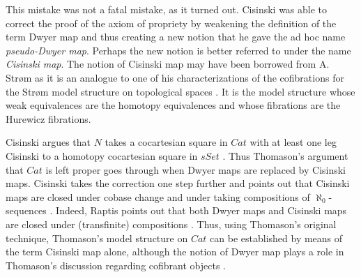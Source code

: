 This mistake was not a fatal mistake, as it turned out. Cisinski was able to correct the proof of the axiom of propriety by weakening the definition of the term Dwyer map and thus creating a new notion that he gave the ad hoc name \emph{pseudo-Dwyer map}. Perhaps the new notion is better referred to under the name \emph{Cisinski map}. The notion of Cisinski map may have been borrowed from A. Str\o m as it is an analogue to one of his characterizations \cite[Thm.~2~(ii), p.~12]{St66} of the cofibrations for the Str\o m model structure on topological spaces \cite{St72}. It is the model structure whose weak equivalences are the homotopy equivalences and whose fibrations are the Hurewicz fibrations.

Cisinski argues that $N$ takes a cocartesian square in $Cat$ with at least one leg Cisinski to a homotopy cocartesian square in $sSet$ \cite{Ci99}. Thus Thomason's argument that $Cat$ is left proper goes through when Dwyer maps are replaced by Cisinski maps. Cisinski takes the correction one step further and points out that Cisinski maps are closed under cobase change and under taking compositions of $\aleph _0$-sequences \cite{Ci99}. Indeed, Raptis points out that both Dwyer maps and Cisinski maps are closed under (transfinite) compositions \cite[Prop.~2.4.~(a),~p.~216]{Ra10}. Thus, using Thomason's original technique, Thomason's model structure on $Cat$ can be established by means of the term Cisinski map alone, although the notion of Dwyer map plays a role in Thomason's discussion regarding cofibrant objects \cite[Lemma 5.6.~(4),p.~323]{Th80}.

